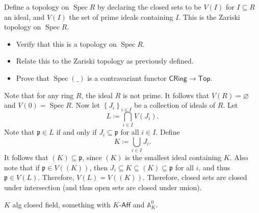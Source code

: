 \documentclass[11pt]{report}
\begin{document}
\begin{exercise}
	Define a topology on $\operatorname{Spec} R$ by declaring the closed sets to be $V(I)$ for $I\subseteq R$ an ideal, and $V(I)$ the set of prime ideals containing $I$. This is the Zariski topology on $\operatorname{Spec} R$.
	\begin{itemize}
		\item Verify that this is a topology on $\operatorname{Spec} R$.
		\item Relate this to the Zariski topology as previously defined.
		\item Prove that $\operatorname{Spec} (\_)$ is a contravariant functor $\mathsf{CRing} \to \mathsf{Top} $.
	\end{itemize}
\end{exercise}
\begin{solution}
	Note that for any ring $R$, the ideal $R$ is not prime. It follows that $V(R)=\varnothing $ and $V(0)=\operatorname{Spec} R$. Now let $\left\{ J_i \right\}_{i\in I} $ be a collection of ideals of $R$. Let
	\[
		L\coloneqq \bigcap_{i\in I} V(J_i)
	.\]
	Note that $\mathfrak{p} \in L$ if and only if $J_i \subseteq \mathfrak{p} $ for all $i\in I$. Define
	\[
		K\coloneqq \bigcup_{i\in I} J_i
	.\]
	It follows that $(K)\subseteq \mathfrak{p} $, since $(K)$ is the smallest ideal containing $K$. Also note that if $\mathfrak{p} \in V((K))$, then $J_i \subseteq K\subseteq (K)\subseteq \mathfrak{p} $ for all $i$, and thus $\mathfrak{p} \in V(L)$. Therefore, $V(L)=V((K))$. Therefore, closed sets are closed under intersection (and thus open sets are closed under union).
\end{solution}

\begin{exercise}
	$K$ alg closed field, something with $K$-$\mathsf{Aff} $ and $\mathbb{A}_K^0$.
\end{exercise}
\end{document}
